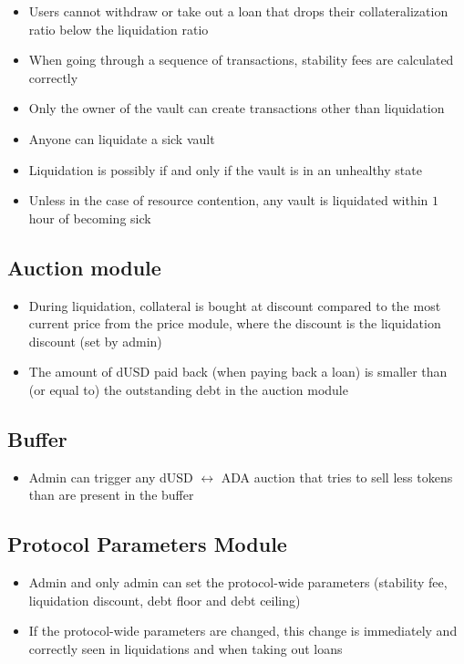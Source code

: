 \documentclass{article} %
\begin{document}
\begin{itemize}
  \item Users cannot withdraw or take out a loan that drops their
    collateralization ratio below the liquidation ratio
  \item When going through a sequence of transactions, stability fees are
    calculated correctly
  \item Only the owner of the vault can create transactions other than
    liquidation
  \item Anyone can liquidate a sick vault
  \item Liquidation is possibly if and only if the vault is in an unhealthy
    state
  \item Unless in the case of resource contention, any vault is liquidated
    within $1$ hour of becoming sick
\end{itemize}

\subsection{Auction module}

\begin{itemize}
  \item During liquidation, collateral is bought at discount compared to the
    most current price from the price module, where the discount is the
    liquidation discount (set by admin)
  \item The amount of dUSD paid back (when paying back a loan) is smaller than
    (or equal to) the outstanding debt in the auction module
\end{itemize}

\subsection{Buffer}

\begin{itemize}
  \item Admin can trigger any dUSD $\leftrightarrow$ ADA auction that tries to
    sell less tokens than are present in the buffer
\end{itemize}

\subsection{Protocol Parameters Module}
\begin{itemize}
  \item Admin and only admin can set the protocol-wide parameters (stability
    fee, liquidation discount, debt floor and debt ceiling)
  \item If the protocol-wide parameters are changed, this change is immediately
    and correctly seen in liquidations and when taking out loans
\end{itemize}  
\end{document}

